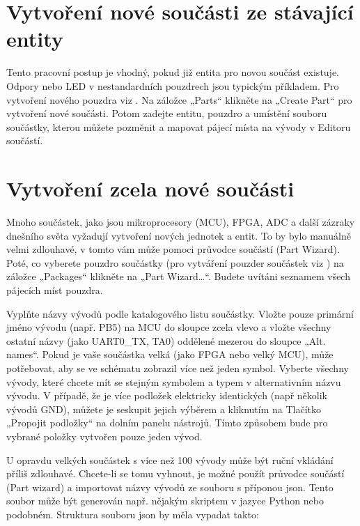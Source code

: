 \documentclass[letterpaper,10pt,czech]{sphinxmanual}
\begin{document}
\section{Vytvoření nové součásti ze stávající entity}
\label{\detokenize{pool-mgr:vytvoreni-nove-soucasti-ze-stavajici-entity}}
Tento pracovní postup je vhodný, pokud již entita pro novou součást
existuje. Odpory nebo LED v nestandardních pouzdrech jsou typickým příkladem. Pro vytvoření nového pouzdra viz {\hyperref[\detokenize{create-package::doc}]{}}. Na záložce „Parts“ klikněte na „Create Part“ pro vytvoření nové součásti. Potom zadejte entitu, pouzdro a umístění souboru součástky, kterou můžete pozměnit a mapovat pájecí místa na vývody v Editoru součástí.


\section{Vytvoření zcela nové součásti}
\label{\detokenize{pool-mgr:vytvoreni-zcela-nove-soucasti}}
Mnoho součástek, jako jsou mikroprocesory (MCU), FPGA, ADC a další zázraky dnešního světa
vyžadují vytvoření nových jednotek a entit. To by bylo manuálně velmi zdlouhavé, v tomto vám může pomoci průvodce součástí (Part Wizard). Poté, co vyberete pouzdro součástky (pro vytváření pouzder součástek viz {\hyperref[\detokenize{create-package::doc}]{}}) na záložce „Packages“ klikněte na „Part Wizard…“. Budete uvítáni seznamem všech pájecích míst pouzdra.

Vyplňte názvy vývodů podle katalogového listu součástky. Vložte pouze primární jméno vývodu (např. PB5) na MCU do sloupce zcela vlevo a vložte všechny ostatní názvy (jako UART0\_TX, TA0) oddělené mezerou do sloupce „Alt. names“. Pokud je vaše součástka  velká (jako FPGA nebo velký MCU), může potřebovat, aby se ve schématu zobrazil více než jeden symbol. Vyberte všechny vývody, které chcete mít se stejným symbolem a typem v alternativním názvu vývodu. V případě, že je více podložek elektricky identických (např
několik vývodů GND), můžete je seskupit jejich výběrem a kliknutím na
Tlačítko „Propojit podložky“ na dolním panelu nástrojů. Tímto způsobem bude pro vybrané položky vytvořen pouze jeden vývod.

U opravdu velkých součástek s více než 100 vývody může být ruční vkládání příliš zdlouhavé. Chcete-li se tomu vyhnout, je možné použít průvodce součástí (Part wizard) a importovat názvy vývodů ze souboru s příponou json. Tento soubor může být generován např. nějakým skriptem v jazyce Python nebo podobném. Struktura souboru json by měla vypadat takto:
\end{document}
